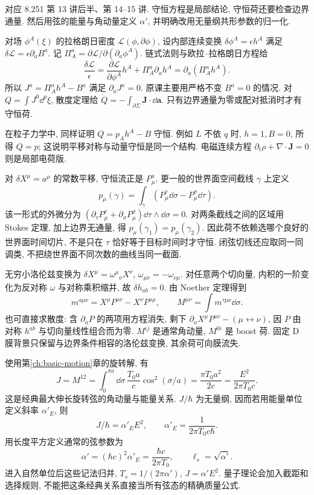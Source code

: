 \label{ch:basic-charges}
对应 8.251 第 13 讲后半、第 14--15 讲. 守恒方程是局部结论, 守恒荷还要检查边界通量. 然后用弦的能量与角动量定义 $\alpha'$, 并明确改用无量纲共形参数的归一化.

对场 $\phi^A(\xi)$ 的拉格朗日密度 $\mathcal L(\phi,\partial\phi)$, 设内部连续变换 $\delta\phi^A=\epsilon h^A$ 满足 $\delta\mathcal L=\epsilon\partial_aB^a$. 记 $\Pi_A^a=\partial\mathcal L/\partial(\partial_a\phi^A)$. 链式法则与欧拉--拉格朗日方程给
\[
 \frac{\delta\mathcal L}{\epsilon}
 =\frac{\partial\mathcal L}{\partial\phi^A}h^A+\Pi_A^a\partial_ah^A
 =\partial_a(\Pi_A^ah^A).
\]
所以 $J^a=\Pi_A^ah^A-B^a$ 满足 $\partial_aJ^a=0$. 原课主要用严格不变 $B^a=0$ 的情况. 对 $Q=\int J^0\dd^p\xi$, 散度定理给 $\dot Q=-\int_{\partial\Sigma}\boldsymbol J\cdot\dd\boldsymbol a$. 只有边界通量为零或配对抵消时才有守恒荷.

在粒子力学中, 同样证明 $Q=p_Ah^A-B$ 守恒. 例如 $L$ 不依 $q$ 时, $h=1,B=0$, 所得 $Q=p$; 这说明平移对称与动量守恒是同一个结构. 电磁连续方程 $\partial_t\rho+\nabla\cdot\boldsymbol J=0$ 则是局部电荷版.

对 $\delta X^\mu=a^\mu$ 的常数平移, 守恒流正是 $P_\mu^a$. 更一般的世界面空间截线 $\gamma$ 上定义
\[
 p_\mu(\gamma)=\int_\gamma(P_\mu^\tau\dd\sigma-P_\mu^\sigma\dd\tau).
\]
该一形式的外微分为 $(\partial_\tau P_\mu^\tau+\partial_\sigma P_\mu^\sigma)\dd\tau\wedge\dd\sigma=0$. 对两条截线之间的区域用 Stokes 定理, 加上边界无通量, 得 $p_\mu(\gamma_1)=p_\mu(\gamma_2)$. 因此荷不依赖选哪个良好的世界面时间切片, 不是只在 $\tau$ 恰好等于目标时间时才守恒. 闭弦切线还应取同一同调类, 不把绕世界面不同次数的曲线当同一截面.

无穷小洛伦兹变换为 $\delta X^\mu=\omega^\mu{}_{\nu}X^\nu$, $\omega_{\mu\nu}=-\omega_{\nu\mu}$. 对任意两个切向量, 内积的一阶变化为反对称 $\omega$ 与对称乘积缩并, 故 $\delta h_{ab}=0$. 由 Noether 定理得到
\[
 m^{a\mu\nu}=X^\mu P^{a\nu}-X^\nu P^{a\mu},\qquad
 M^{\mu\nu}=\int m^{\tau\mu\nu}\dd\sigma.
\]
也可直接求散度: 含 $\partial_aP$ 的两项用方程消失, 剩下 $\partial_aX^\mu P^{a\nu}-(\mu\leftrightarrow\nu)$, 因 $P$ 由对称 $h^{ab}$ 与切向量线性组合而为零. $M^{ij}$ 是通常角动量, $M^{0i}$ 是 boost 荷. 固定 D 膜背景只保留与边界条件相容的洛伦兹变换, 其余荷可向膜流失.

使用第\ref{ch:basic-motion}章的旋转解, 有
\[
 J=M^{12}=\int_0^{\pi a}\dd\sigma\,
 \frac{T_0a}{c}\cos^2(\sigma/a)
 =\frac{\pi T_0a^2}{2c}=\frac{E^2}{2\pi T_0c}.
\]
这是经典最大伸长旋转弦的角动量与能量关系. $J/\hbar$ 为无量纲, 因而若用能量单位定义斜率 $\alpha'_E$, 则
\[
 J/\hbar=\alpha'_E E^2,\qquad
 \alpha'_E=\frac1{2\pi T_0c\hbar}.
\]
用长度平方定义通常的弦参数为
\[
 \alpha'= (\hbar c)^2\alpha'_E
 =\frac{\hbar c}{2\pi T_0},\qquad\ell_s=\sqrt{\alpha'}.
\]
进入自然单位后这些记法归并, $T_s=1/(2\pi\alpha')$, $J=\alpha'E^2$. 量子理论会加入截距和选择规则, 不能把这条经典关系直接当所有弦态的精确质量公式.

